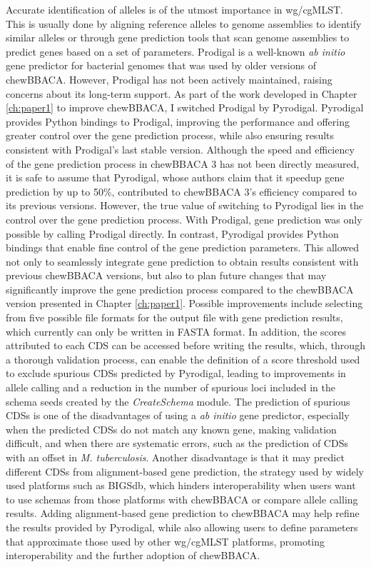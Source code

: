 Accurate identification of alleles is of the utmost importance in wg/cgMLST. This is usually done by aligning reference alleles to genome assemblies to identify similar alleles or through gene prediction tools that scan genome assemblies to predict genes based on a set of parameters. Prodigal is a well-known \textit{ab initio} gene predictor for bacterial genomes that was used by older versions of chewBBACA. However, Prodigal has not been actively maintained, raising concerns about its long-term support. As part of the work developed in Chapter \ref{ch:paper1} to improve chewBBACA, I switched Prodigal by Pyrodigal. Pyrodigal provides Python bindings to Prodigal, improving the performance and offering greater control over the gene prediction process, while also ensuring results consistent with Prodigal's last stable version. Although the speed and efficiency of the gene prediction process in chewBBACA 3 has not been directly measured, it is safe to assume that Pyrodigal, whose authors claim that it speedup gene prediction by up to 50\%, contributed to chewBBACA 3's efficiency compared to its previous versions. However, the true value of switching to Pyrodigal lies in the control over the gene prediction process. With Prodigal, gene prediction was only possible by calling Prodigal directly. In contrast, Pyrodigal provides Python bindings that enable fine control of the gene prediction parameters. This allowed not only to seamlessly integrate gene prediction to obtain results consistent with previous chewBBACA versions, but also to plan future changes that may significantly improve the gene prediction process compared to the chewBBACA version presented in Chapter \ref{ch:paper1}. Possible improvements include selecting from five possible file formats for the output file with gene prediction results, which currently can only be written in FASTA format. In addition, the scores attributed to each CDS can be accessed before writing the results, which, through a thorough validation process, can enable the definition of a score threshold used to exclude spurious \ac{CDSs} predicted by Pyrodigal, leading to improvements in allele calling and a reduction in the number of spurious loci included in the schema seeds created by the \textit{CreateSchema} module. The prediction of spurious CDSs is one of the disadvantages of using a \textit{ab initio} gene predictor, especially when the predicted CDSs do not match any known gene, making validation difficult, and when there are systematic errors, such as the prediction of CDSs with an offset in \textit{M. tuberculosis}. Another disadvantage is that it may predict different CDSs from alignment-based gene prediction, the strategy used by widely used platforms such as BIGSdb, which hinders interoperability when users want to use schemas from those platforms with chewBBACA or compare allele calling results. Adding alignment-based gene prediction to chewBBACA may help refine the results provided by Pyrodigal, while also allowing users to define parameters that approximate those used by other wg/cgMLST platforms, promoting interoperability and the further adoption of chewBBACA.

